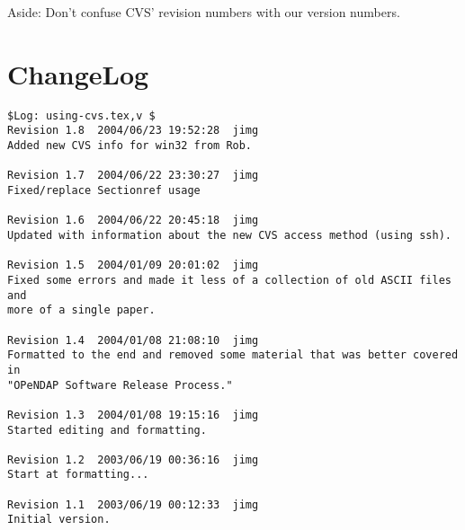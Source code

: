 \documentclass{dods-paper}
\begin{document}
Aside: Don't confuse CVS' revision numbers with our version numbers.

\appendix

\section{ChangeLog}

\begin{verbatim}
$Log: using-cvs.tex,v $
Revision 1.8  2004/06/23 19:52:28  jimg
Added new CVS info for win32 from Rob.

Revision 1.7  2004/06/22 23:30:27  jimg
Fixed/replace Sectionref usage

Revision 1.6  2004/06/22 20:45:18  jimg
Updated with information about the new CVS access method (using ssh).

Revision 1.5  2004/01/09 20:01:02  jimg
Fixed some errors and made it less of a collection of old ASCII files and
more of a single paper.

Revision 1.4  2004/01/08 21:08:10  jimg
Formatted to the end and removed some material that was better covered in
"OPeNDAP Software Release Process."

Revision 1.3  2004/01/08 19:15:16  jimg
Started editing and formatting.

Revision 1.2  2003/06/19 00:36:16  jimg
Start at formatting...

Revision 1.1  2003/06/19 00:12:33  jimg
Initial version.
\end{verbatim}
\end{document}
